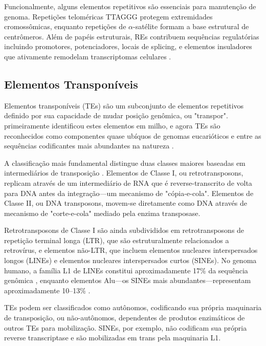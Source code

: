 Funcionalmente, alguns elementos repetitivos são essenciais para manutenção de genoma. Repetições teloméricas TTAGGG protegem extremidades cromossômicas, enquanto repetições de $\alpha$-satélite formam a base estrutural de centrômeros. Além de papéis estruturais, REs contribuem sequências regulatórias incluindo promotores, potenciadores, locais de splicing, e elementos insuladores que ativamente remodelam transcriptomas celulares \parencite{rebollo2012,chuong2017,lu2020}.

\subsection{Elementos Transponíveis}

Elementos transponíveis (TEs) são um subconjunto de elementos repetitivos definido por sua capacidade de mudar posição genômica, ou "transpor". \textcite{mcclintock1950} primeiramente identificou estes elementos em milho, e agora TEs são reconhecidos como componentes quase ubíquos de genomas eucarióticos e entre as sequências codificantes mais abundantes na natureza \parencite{hayward2022,wells2020}.

A classificação mais fundamental distingue duas classes maiores baseadas em intermediários de transposição \parencite{wicker2007}. Elementos de Classe I, ou retrotransposons, replicam através de um intermediário de RNA que é reverse-transcrito de volta para DNA antes da integração---um mecanismo de "cópia-e-cola". Elementos de Classe II, ou DNA transposons, movem-se diretamente como DNA através de mecanismo de "corte-e-cola" mediado pela enzima transposase.

Retrotransposons de Classe I são ainda subdivididos em retrotransposons de repetição terminal longa (LTR), que são estruturalmente relacionados a retrovírus, e elementos não-LTR, que incluem elementos nucleares interspersados longos (LINEs) e elementos nucleares interspersados curtos (SINEs). No genoma humano, a família L1 de LINEs constitui aproximadamente 17\% da sequência genômica \parencite{finnegan1989}, enquanto elementos Alu---os SINEs mais abundantes---representam aproximadamente 10--13\% \parencite{batzer2002,dewannieux2003}.

TEs podem ser classificados como autônomos, codificando sua própria maquinaria de transposição, ou não-autônomos, dependentes de produtos enzimáticos de outros TEs para mobilização. SINEs, por exemplo, não codificam sua própria reverse transcriptase e são mobilizadas em trans pela maquinaria L1.

